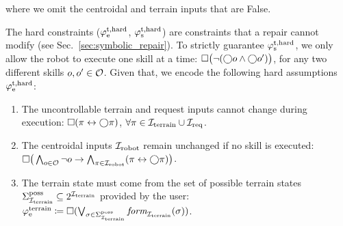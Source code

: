 \documentclass[letterpaper, 10 pt, conference]{ieeeconf}
\begin{document}
where we omit the centroidal and terrain inputs that are False.

The hard constraints ($\varphi_\textrm{e}^\textrm{t,hard}$, $\varphi_\textrm{s}^\textrm{t,hard}$) are constraints that a repair cannot modify 
(see Sec.~\ref{sec:symbolic_repair}).
To strictly guarantee $\varphi_\textrm{s}^\textrm{t,hard}$,
we only allow the robot to execute one skill at a time:
    $\square\big(\neg (\bigcirc o \land \bigcirc o')\big)$, for any two different skills $o, o' \in {\mathcal O}$. Given that, 
we encode the following hard assumptions $\varphi_\textrm{e}^\textrm{t,hard}$:
\begin{enumerate}[label=\arabic*),ref=\arabic*]
    \item The uncontrollable terrain and request inputs 
    cannot change during execution:
    $\square (\pi \leftrightarrow \bigcirc \pi)$,
    $\forall \pi \in {\mathcal I}_{\textrm{terrain}} \cup {\mathcal I}_{\textrm{req}}$.
    \item The centroidal inputs ${\mathcal I}_{\textrm{robot}}$ remain unchanged if no skill is executed: 
    $\square\big(\bigwedge_{o\in{\mathcal O}} \neg o \to \bigwedge_{\pi\in{\mathcal I}_{\textrm{robot}}} (\pi \leftrightarrow \bigcirc \pi)\big)$.
    \item \label{assumption:poss_terrain}
    The terrain state must come from the set of possible terrain states $\Sigma_{{\mathcal I}_{\textrm{terrain}}}^{\textrm{poss}} \subseteq 2^{{\mathcal I}_{\textrm{terrain}}}$ provided by the user:
    $\varphi_\textrm{e}^\textrm{terrain} \coloneqq \square (
    \bigvee_{\sigma\in\Sigma_{{\mathcal I}_{\textrm{terrain}}}^{\textrm{poss}}}
    \textit{form}_{{\mathcal I}_{\textrm{terrain}}}(\sigma)
    )$.
\end{enumerate}

\end{document}

